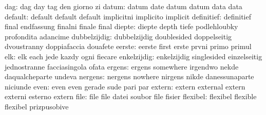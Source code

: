                       dag: dag                       day
                           tag                       den
                           giorno                    zi
                    datum: datum                     date
                           datum                     datum
                           data                      data
                  default: default                   default
                           default                   implicitni
                           implicito                 implicit
               definitief: definitief                final
                           endfassung                finalni
                           finale                    final
                   diepte: diepte                    depth
                           tiefe                     podlehloubky
                           profondita                adancime
             dubbelzijdig: dubbelzijdig              doublesided
                           doppelseitig              dvoustranny
                           doppiafaccia              douafete
                   eerste: eerste                    first
                           erste                     prvni
                           primo                     primul
                      elk: elk                       each
                           jede                      kazdy
                           ogni                      fiecare
              enkelzijdig: enkelzijdig               singlesided
                           einzelseitig              jednostranne
                           facciasingola             ofata
                   ergens: ergens                    somewhere
                           irgendwo                  nekde
                           daqualcheparte            undeva
                  nergens: nergens                   nowhere
                           nirgens                   nikde
                           danessunaparte            niciunde
                     even: even                      even
                           gerade                    sude
                           pari                      par
                   extern: extern                    external
                           extern                    externi
                           esterno                   extern
                     file: file                      file
                           datei                     soubor
                           file                      fisier
                 flexibel: flexibel                  flexible
                           flexibel                  prizpusobive
